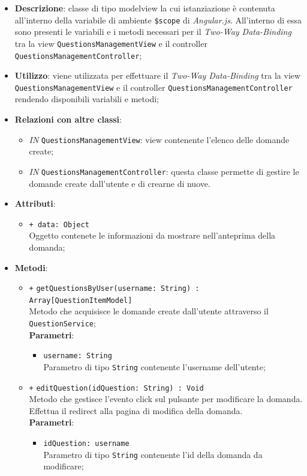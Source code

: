 \begin{itemize}
	\item \textbf{Descrizione}: classe di tipo modelview la cui istanziazione è contenuta all'interno della variabile di ambiente \texttt{\$scope} di \textit{Angular.js}. All'interno di essa sono presenti le variabili e i metodi necessari per il \textit{Two-Way Data-Binding} tra la view \texttt{QuestionsManagementView} e il controller \texttt{QuestionsManagementController};
	\item \textbf{Utilizzo}: viene utilizzata per effettuare il \textit{Two-Way Data-Binding} tra la view \texttt{QuestionsManagementView} e il controller \texttt{QuestionsManagementController} rendendo disponibili variabili e metodi;
	\item \textbf{Relazioni con altre classi}: 
	\begin{itemize}
		\item \textit{IN} \texttt{QuestionsManagementView}: view contenente l’elenco delle domande create; 
		\item \textit{IN} \texttt{QuestionsManagementController}: questa classe permette di gestire le domande create dall’utente e di crearne di nuove.
	\end{itemize}
	\item \textbf{Attributi}: 
	\begin{itemize}
		\item \texttt{+ data: Object} \\ Oggetto contenete le informazioni da mostrare nell'anteprima della domanda;
	\end{itemize}
	\item \textbf{Metodi}: 
	\begin{itemize}
			\item \texttt{+} \texttt{getQuestionsByUser(username: String) : Array[QuestionItemModel]} \\ 
			Metodo che acquisisce le domande create dall'utente attraverso il \texttt{QuestionService};\\
			\textbf{Parametri}:
			\begin{itemize}
				\item \texttt{username: String} \\
				Parametro di tipo \texttt{String} contenente l'username dell'utente;
			\end{itemize}
			\item \texttt{+} \texttt{editQuestion(idQuestion: String) : Void} \\ 
			Metodo che gestisce l’evento click sul pulsante per modificare la domanda. Effettua il redirect alla pagina di modifica della domanda. \\
			\textbf{Parametri}:
			\begin{itemize}
				\item \texttt{idQuestion: username} \\
				Parametro di tipo \texttt{String} contenente l'id della domanda da modificare;
			\end{itemize}
	\end{itemize}
\end{itemize}	

